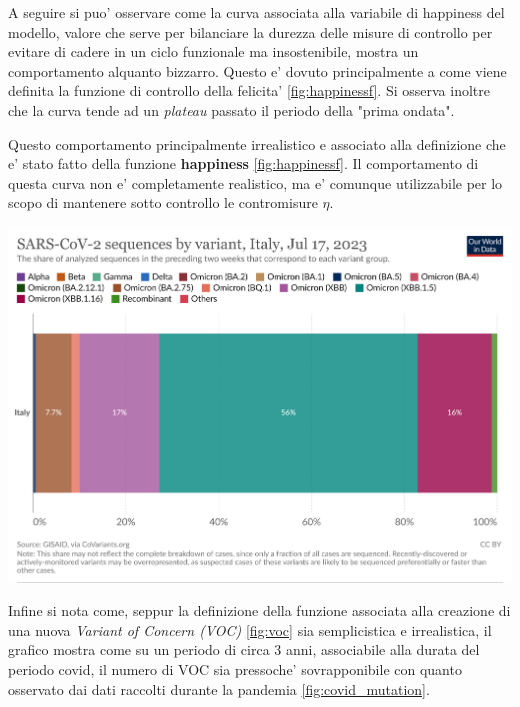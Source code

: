 A seguire si puo' osservare come la curva associata alla variabile di happiness del modello,
valore che serve per bilanciare la durezza delle misure di controllo per evitare 
di cadere in un ciclo funzionale ma insostenibile, mostra un comportamento alquanto bizzarro.
Questo e' dovuto principalmente a come viene definita la funzione di controllo della felicita' \ref{fig:happinessf}.
Si osserva inoltre che la curva tende ad un \emph{plateau} passato il periodo della "prima ondata".

Questo comportamento principalmente irrealistico e associato alla definizione che e' stato fatto della 
funzione \textbf{happiness} \ref{fig:happinessf}. Il comportamento di questa curva non e' completamente 
realistico, ma e' comunque utilizzabile per lo scopo di mantenere sotto controllo le contromisure $\eta$.

\begin{minipage}{\linewidth}
	\centering
	\includegraphics[width=\textwidth]{img/coronavirus-data-explorer.png}
	\label{fig:covid_mutation}
\end{minipage}

Infine si nota come, seppur la definizione della funzione associata alla creazione di una
nuova \emph{Variant of Concern (VOC)} \ref{fig:voc} sia semplicistica e irrealistica, 
il grafico mostra come su un periodo di circa 3 anni, associabile alla durata del periodo covid, 
il numero di VOC sia pressoche' sovrapponibile con quanto osservato dai dati raccolti durante la pandemia \ref{fig:covid_mutation}. 

